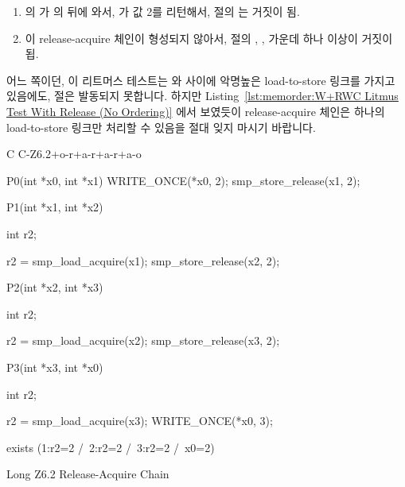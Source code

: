 \begin{enumerate}
\item	{} 의  가  의  뒤에
	와서,  가 값 2를 리턴해서,  절의 
	는 거짓이 됨.
\item	이 release-acquire 체인이 형성되지 않아서,  절의
	, ,  가운데 하나 이상이 거짓이 됩.

\end{enumerate}

어느 쪽이던, 이 리트머스 테스트는  와  사이에 악명높은
load-to-store 링크를 가지고 있음에도,  절은 발동되지 못합니다.
하지만
Listing~\ref{lst:memorder:W+RWC Litmus Test With Release (No Ordering)}
에서 보였듯이 release-acquire 체인은 하나의 load-to-store 링크만 처리할 수
있음을 절대 잊지 마시기 바랍니다.

\begin{listing}[tbp]
{ \scriptsize
\begin{verbbox}[\LstLineNo]
C C-Z6.2+o-r+a-r+a-r+a-o
{
}

P0(int *x0, int *x1)
{
  WRITE_ONCE(*x0, 2);
  smp_store_release(x1, 2);
}


P1(int *x1, int *x2)
{
  int r2;

  r2 = smp_load_acquire(x1);
  smp_store_release(x2, 2);
}

P2(int *x2, int *x3)
{
  int r2;

  r2 = smp_load_acquire(x2);
  smp_store_release(x3, 2);
}

P3(int *x3, int *x0)
{
  int r2;

  r2 = smp_load_acquire(x3);
  WRITE_ONCE(*x0, 3);
}

exists (1:r2=2 /\ 2:r2=2 /\ 3:r2=2 /\ x0=2)
\end{verbbox}
}
\centering
\theverbbox
\caption{Long Z6.2 Release-Acquire Chain}
\label{lst:memorder:Long Z6.2 Release-Acquire Chain}
\end{listing}

